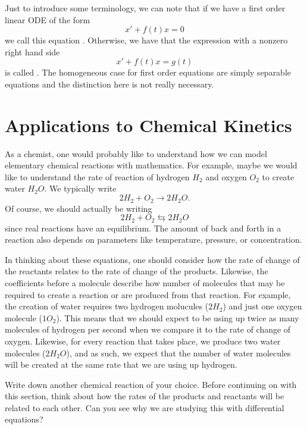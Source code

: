         Just to introduce some terminology, we can note that if we have a first order linear ODE of the form
        \[
        x'+f(t)x=0
        \]
        we call this equation .  Otherwise, we have that the expression with a nonzero right hand side
        \[
        x'+ f(t)x=g(t)
        \]
        is called .  The homogeneous case for first order equations are simply separable equations and the distinction here is not really necessary.

        \section{Applications to Chemical Kinetics}
        As a chemist, one would probably like to understand how we can model elementary chemical reactions with mathematics.  For example, maybe we would like to understand the rate of reaction of hydrogen $H_2$ and oxygen $O_2$ to create water $H_2 O$. We typically write
        \[
        2H_2 + O_2 \to 2H_2O.
        \]
        \noindent Of course, we should actually be writing
        \[
        2H_2 + O_2 \leftrightarrows 2H_2O
        \]
        since real reactions have an equilibrium.  The amount of back and forth in a reaction also depends on parameters like temperature, pressure, or concentration.

        In thinking about these equations, one should consider how the rate of change of the reactants relates to the rate of change of the products.  Likewise, the coefficients before a molecule describe how number of molecules that may be required to create a reaction or are produced from that reaction.  For example, the creation of water requires two hydrogen molucules ($2H_2$) and just one oxygen molecule ($1O_2$).  This means that we should expect to be using up twice as many molecules of hydrogen per second when we compare it to the rate of change of oxygen.  Likewise, for every reaction that takes place, we produce two water molecules ($2H_2O$), and as such, we expect that the number of water molecules will be created at the same rate that we are using up hydrogen.

        \begin{question}
            Write down another chemical reaction of your choice.  Before continuing on with this section, think about how the rates of the products and reactants will be related to each other. Can you see why we are studying this with differential equations?
        \end{question}

